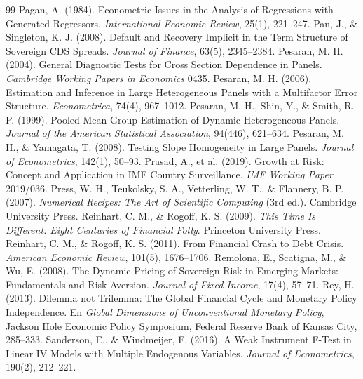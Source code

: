 \begin{thebibliography}{99}
 Pagan, A. (1984). Econometric Issues in the Analysis of Regressions with Generated Regressors. \textit{International Economic Review}, 25(1), 221--247.
 Pan, J., \& Singleton, K. J. (2008). Default and Recovery Implicit in the Term Structure of Sovereign CDS Spreads. \textit{Journal of Finance}, 63(5), 2345--2384.
 Pesaran, M. H. (2004). General Diagnostic Tests for Cross Section Dependence in Panels. \textit{Cambridge Working Papers in Economics} 0435.
 Pesaran, M. H. (2006). Estimation and Inference in Large Heterogeneous Panels with a Multifactor Error Structure. \textit{Econometrica}, 74(4), 967--1012.
 Pesaran, M. H., Shin, Y., \& Smith, R. P. (1999). Pooled Mean Group Estimation of Dynamic Heterogeneous Panels. \textit{Journal of the American Statistical Association}, 94(446), 621--634.
 Pesaran, M. H., \& Yamagata, T. (2008). Testing Slope Homogeneity in Large Panels. \textit{Journal of Econometrics}, 142(1), 50--93.
 Prasad, A., et al. (2019). Growth at Risk: Concept and Application in IMF Country Surveillance. \textit{IMF Working Paper} 2019/036.
 Press, W. H., Teukolsky, S. A., Vetterling, W. T., \& Flannery, B. P. (2007). \textit{Numerical Recipes: The Art of Scientific Computing} (3rd ed.). Cambridge University Press.
 Reinhart, C. M., \& Rogoff, K. S. (2009). \textit{This Time Is Different: Eight Centuries of Financial Folly}. Princeton University Press.
 Reinhart, C. M., \& Rogoff, K. S. (2011). From Financial Crash to Debt Crisis. \textit{American Economic Review}, 101(5), 1676--1706.
 Remolona, E., Scatigna, M., \& Wu, E. (2008). The Dynamic Pricing of Sovereign Risk in Emerging Markets: Fundamentals and Risk Aversion. \textit{Journal of Fixed Income}, 17(4), 57--71.
 Rey, H. (2013). Dilemma not Trilemma: The Global Financial Cycle and Monetary Policy Independence. En \textit{Global Dimensions of Unconventional Monetary Policy}, Jackson Hole Economic Policy Symposium, Federal Reserve Bank of Kansas City, 285--333.
 Sanderson, E., \& Windmeijer, F. (2016). A Weak Instrument F-Test in Linear IV Models with Multiple Endogenous Variables. \textit{Journal of Econometrics}, 190(2), 212--221.

\end{thebibliography}
